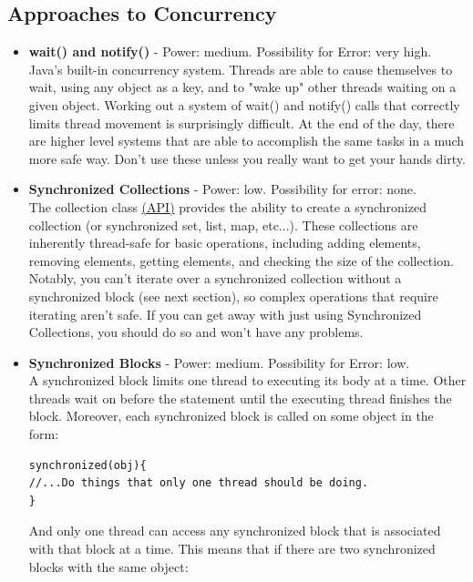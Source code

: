 \documentclass[11pt]{article}
\begin{document}
\subsection{Approaches to Concurrency}
\begin{itemize}
\item \textbf{wait() and notify()} - Power: medium. Possibility for Error: very high.\\
Java's built-in concurrency system. Threads are able to cause themselves to wait, using any object as a key, and to "wake up" other threads waiting on a given object. Working out a system of wait() and notify() calls that correctly limits thread movement is surprisingly difficult. At the end of the day, there are higher level systems that are able to accomplish the same tasks in a much more safe way. Don't use these unless you really want to get your hands dirty.
\item \textbf{Synchronized Collections} - Power: low. Possibility for error: none. \\
The collection class \href{http://docs.oracle.com/javase/7/docs/api/java/util/Collections.html\#synchronizedCollection(java.util.Collection)}{({\color{blue}\underline{API}})} provides the ability to create a synchronized collection (or synchronized set, list, map, etc...). These collections are inherently thread-safe for basic operations, including adding elements, removing elements, getting elements, and checking the size of the collection. Notably, you can't iterate over a synchronized collection without a synchronized block (see next section), so complex operations that require iterating aren't safe. If you can get away with just using Synchronized Collections, you should do so and won't have any problems.
\item \textbf{Synchronized Blocks} - Power: medium. Possibility for Error: low.\\
A synchronized block limits one thread to executing its body at a time. Other threads wait on before the statement until the executing thread finishes the block. Moreover, each synchronized block is called on some object in the form:
\begin{lstlisting}[frame=single]
synchronized(obj){
//...Do things that only one thread should be doing.
}
\end{lstlisting}
And only one thread can access any synchronized block that is associated with that block at a time. This means that if there are two synchronized blocks with the same object:
\begin{lstlisting}[frame=single]

\end{lstlisting}
\end{itemize}
\end{document}
